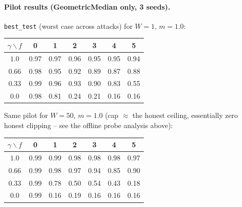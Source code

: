 \documentclass{article}
\begin{document}
\paragraph{Pilot results (GeometricMedian only, 3 seeds).} \texttt{best\_test} (worst
case across attacks) for $W=1$, $m=1.0$:
\begin{center}
\begin{tabular}{c|cccccc}
$\gamma \backslash f$ & 0 & 1 & 2 & 3 & 4 & 5 \\ \hline
$1.0$  & 0.97 & 0.97 & 0.96 & 0.95 & 0.95 & 0.94 \\
$0.66$ & 0.98 & 0.95 & 0.92 & 0.89 & 0.87 & 0.88 \\
$0.33$ & 0.99 & 0.96 & 0.93 & 0.90 & 0.83 & 0.55 \\
$0.0$  & 0.98 & 0.81 & 0.24 & 0.21 & 0.16 & 0.16 \\
\end{tabular}
\end{center}
Same pilot for $W=50$, $m=1.0$ (cap $\approx$ the honest ceiling, essentially
zero honest clipping -- see the offline probe analysis above):
\begin{center}
\begin{tabular}{c|cccccc}
$\gamma \backslash f$ & 0 & 1 & 2 & 3 & 4 & 5 \\ \hline
$1.0$  & 0.99 & 0.99 & 0.98 & 0.98 & 0.98 & 0.97 \\
$0.66$ & 0.99 & 0.98 & 0.97 & 0.94 & 0.85 & 0.90 \\
$0.33$ & 0.99 & 0.78 & 0.50 & 0.54 & 0.43 & 0.18 \\
$0.0$  & 0.99 & 0.16 & 0.19 & 0.16 & 0.16 & 0.16 \\
\end{tabular}
\end{center}
\end{document}
